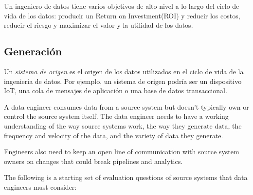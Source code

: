 \documentclass[12pt]{book}
\begin{document}
Un ingeniero de datos tiene varios objetivos de alto nivel a lo largo del ciclo de vida de los datos: producir un Return on Investment(ROI) y reducir los costos, reducir el riesgo y maximizar el valor y la utilidad de los datos.

\subsection{Generación}
Un \textit{sistema de origen} es el origen de los datos utilizados en el ciclo de vida de la ingeniería de datos. Por ejemplo, un sistema de origen podría ser un dispositivo IoT, una cola de mensajes de aplicación o una base de datos transaccional.

A data engineer consumes data from a source system but doesn’t typically own or control the source system itself. The data engineer needs to have a working understanding of the way source systems work, the way they generate data, the frequency and velocity of the data, and the variety of data they generate. 

Engineers also need to keep an open line of communication with source system owners on changes that could break pipelines and analytics.

The following is a starting set of evaluation questions of source systems that data engineers must consider:\\
\end{document}
